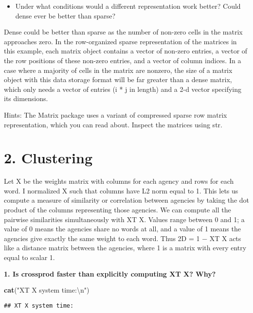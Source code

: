 \documentclass[]{article}
\newenvironment{Shaded}{\begin{snugshade}}{\end{snugshade}}
\newcommand{\CharTok}[1]{\textcolor[rgb]{0.31,0.60,0.02}{#1}}
\newcommand{\KeywordTok}[1]{\textcolor[rgb]{0.13,0.29,0.53}{\textbf{#1}}}
\newcommand{\NormalTok}[1]{#1}
\newcommand{\StringTok}[1]{\textcolor[rgb]{0.31,0.60,0.02}{#1}}
\providecommand{\tightlist}{%
  \setlength{\itemsep}{0pt}\setlength{\parskip}{0pt}}
\begin{document}
\begin{itemize}
\tightlist
\item
  Under what conditions would a different representation work better?
  Could dense ever be better than sparse?
\end{itemize}

Dense could be better than sparse as the number of non-zero cells in the
matrix approaches zero. In the row-organized sparse representation of
the matrices in this example, each matrix object contains a vector of
non-zero entries, a vector of the row positions of these non-zero
entries, and a vector of column indices. In a case where a majority of
cells in the matrix are nonzero, the size of a matrix object with this
data storage format will be far greater than a dense matrix, which only
needs a vector of entries (i * j in length) and a 2-d vector specifying
its dimensions.

Hints: The Matrix package uses a variant of compressed sparse row matrix
representation, which you can read about. Inspect the matrices using
str.

\hypertarget{clustering}{%
\section{2. Clustering}\label{clustering}}

Let X be the weights matrix with columns for each agency and rows for
each word. I normalized X such that columns have L2 norm equal to 1.
This lets us compute a measure of similarity or correlation between
agencies by taking the dot product of the columns representing those
agencies. We can compute all the pairwise similarities simultaneously
with XT X. Values range between 0 and 1; a value of 0 means the agencies
share no words at all, and a value of 1 means the agencies give exactly
the same weight to each word. Thus 2D = 1 − XT X acts like a distance
matrix between the agencies, where 1 is a matrix with every entry equal
to scalar 1.

\textbf{1. Is crossprod faster than explicitly computing XT X? Why?}

\begin{Shaded}
\begin{Highlighting}[]
\KeywordTok{cat}\NormalTok{(}\StringTok{"XT X system time:}\CharTok{\textbackslash{}n}\StringTok{"}\NormalTok{)}
\end{Highlighting}
\end{Shaded}

\begin{verbatim}
## XT X system time:
\end{verbatim}
\end{document}
